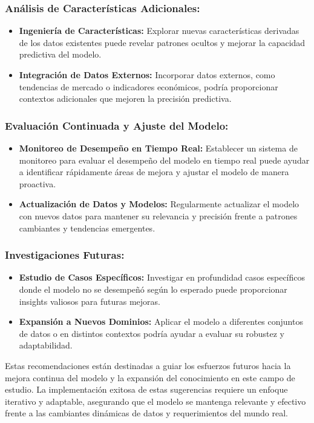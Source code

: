 \subsubsection{Análisis de Características Adicionales:}
\begin{itemize}
    \item \textbf{Ingeniería de Características:} Explorar nuevas características derivadas de los datos existentes puede revelar patrones ocultos y mejorar la capacidad predictiva del modelo.
    \item \textbf{Integración de Datos Externos:} Incorporar datos externos, como tendencias de mercado o indicadores económicos, podría proporcionar contextos adicionales que mejoren la precisión predictiva.
\end{itemize}

\subsubsection{Evaluación Continuada y Ajuste del Modelo:}
\begin{itemize}
    \item \textbf{Monitoreo de Desempeño en Tiempo Real:} Establecer un sistema de monitoreo para evaluar el desempeño del modelo en tiempo real puede ayudar a identificar rápidamente áreas de mejora y ajustar el modelo de manera proactiva.
    \item \textbf{Actualización de Datos y Modelos:} Regularmente actualizar el modelo con nuevos datos para mantener su relevancia y precisión frente a patrones cambiantes y tendencias emergentes.
\end{itemize}

\subsubsection{Investigaciones Futuras:}
\begin{itemize}
    \item \textbf{Estudio de Casos Específicos:} Investigar en profundidad casos específicos donde el modelo no se desempeñó según lo esperado puede proporcionar insights valiosos para futuras mejoras.
    \item \textbf{Expansión a Nuevos Dominios:} Aplicar el modelo a diferentes conjuntos de datos o en distintos contextos podría ayudar a evaluar su robustez y adaptabilidad.
\end{itemize}

Estas recomendaciones están destinadas a guiar los esfuerzos futuros hacia la mejora continua del modelo y la expansión del conocimiento en este campo de estudio. La implementación exitosa de estas sugerencias requiere un enfoque iterativo y adaptable, asegurando que el modelo se mantenga relevante y efectivo frente a las cambiantes dinámicas de datos y requerimientos del mundo real.